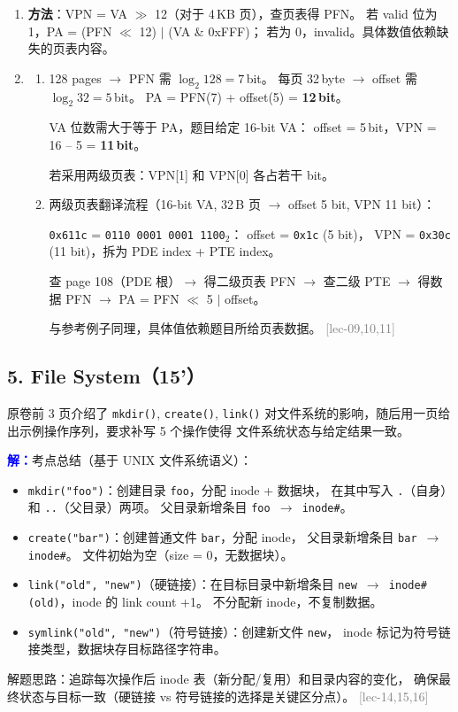 \documentclass[11pt,a4paper]{article}
\newcommand{\ans}{\par\noindent\textcolor{blue}{\textbf{解：}}}
\newcommand{\lec}[1]{\textcolor{gray}{[lec-#1]}}
\begin{document}
\begin{enumerate}[label=(\arabic*),leftmargin=*]
  \item \textbf{方法}：VPN = VA $\gg$ 12（对于 4\,KB 页），查页表得 PFN。
        若 valid 位为 1，PA = (PFN $\ll$ 12) $|$ (VA \& 0xFFF)；
        若为 0，invalid。具体数值依赖缺失的页表内容。

  \item
  \begin{enumerate}[label=(\alph*)]
    \item 128 pages $\to$ PFN 需 $\log_2 128 = 7$\,bit。
          每页 32\,byte $\to$ offset 需 $\log_2 32 = 5$\,bit。
          PA = PFN(7) + offset(5) = \textbf{12\,bit}。

          VA 位数需大于等于 PA，题目给定 16-bit VA：
          offset = 5\,bit，VPN = 16 -- 5 = \textbf{11\,bit}。

          若采用两级页表：VPN[1] 和 VPN[0] 各占若干 bit。

    \item 两级页表翻译流程（16-bit VA, 32\,B 页 $\to$ offset 5 bit,
          VPN 11 bit）：

          \texttt{0x611c} = \texttt{0110 0001 0001 1100}$_2$：
          offset = \texttt{0x1c} (5 bit)，
          VPN = \texttt{0x30c} (11 bit)，拆为 PDE index + PTE index。

          查 page 108（PDE 根）$\to$ 得二级页表 PFN $\to$
          查二级 PTE $\to$ 得数据 PFN $\to$ PA = PFN $\ll$ 5 $|$ offset。

          与参考例子同理，具体值依赖题目所给页表数据。 \lec{09,10,11}
  \end{enumerate}
\end{enumerate}

\subsection*{5. File System（15'）}

原卷前 3 页介绍了 \texttt{mkdir()}, \texttt{create()}, \texttt{link()}
对文件系统的影响，随后用一页给出示例操作序列，要求补写 5 个操作使得
文件系统状态与给定结果一致。

\ans 考点总结（基于 UNIX 文件系统语义）：

\begin{itemize}[nosep]
  \item \texttt{mkdir("foo")}：创建目录 \texttt{foo}，分配 inode + 数据块，
        在其中写入 \texttt{.}（自身）和 \texttt{..}（父目录）两项。
        父目录新增条目 \texttt{foo $\to$ inode\#}。
  \item \texttt{create("bar")}：创建普通文件 \texttt{bar}，分配 inode，
        父目录新增条目 \texttt{bar $\to$ inode\#}。
        文件初始为空（size = 0，无数据块）。
  \item \texttt{link("old", "new")}（硬链接）：在目标目录中新增条目
        \texttt{new $\to$ inode\#(old)}，inode 的 link count +1。
        不分配新 inode，不复制数据。
  \item \texttt{symlink("old", "new")}（符号链接）：创建新文件 \texttt{new}，
        inode 标记为符号链接类型，数据块存目标路径字符串。
\end{itemize}

\noindent 解题思路：追踪每次操作后 inode 表（新分配/复用）和目录内容的变化，
确保最终状态与目标一致（硬链接 vs 符号链接的选择是关键区分点）。 \lec{14,15,16}
\end{document}
